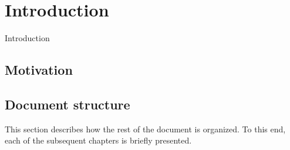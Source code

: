 \chapter{Introduction} %

Introduction


\section{Motivation}



\section{Document structure}

This section describes how the rest of the document is organized. To this end, each of the subsequent chapters is briefly presented.


